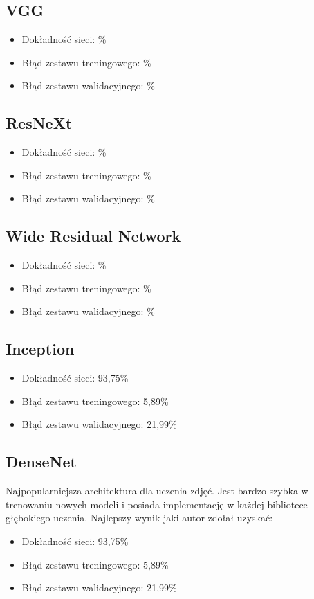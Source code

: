 \documentclass[12pt,a4paper,twoside,titlepage,openright]{book}
\begin{document}
\subsection{VGG}
\begin{itemize}
\item Dokładność sieci: \%
\item Błąd zestawu treningowego: \%
\item Błąd zestawu walidacyjnego: \%
\end{itemize}

\subsection{ResNeXt}
\begin{itemize}
\item Dokładność sieci: \%
\item Błąd zestawu treningowego: \%
\item Błąd zestawu walidacyjnego: \%
\end{itemize}

\subsection{Wide Residual Network}
\begin{itemize}
\item Dokładność sieci: \%
\item Błąd zestawu treningowego: \%
\item Błąd zestawu walidacyjnego: \%
\end{itemize}

\subsection{Inception} %
\begin{itemize}
\item Dokładność sieci: 93,75\%
\item Błąd zestawu treningowego: 5,89\%
\item Błąd zestawu walidacyjnego: 21,99\%
\end{itemize}

\subsection{DenseNet} %
Najpopularniejsza architektura dla uczenia zdjęć. Jest bardzo szybka w trenowaniu nowych modeli i posiada implementację w każdej bibliotece głębokiego uczenia. Najlepszy wynik jaki autor zdołał uzyskać:
\begin{itemize}
\item Dokładność sieci: 93,75\%
\item Błąd zestawu treningowego: 5,89\%
\item Błąd zestawu walidacyjnego: 21,99\%
\end{itemize}
\end{document}
